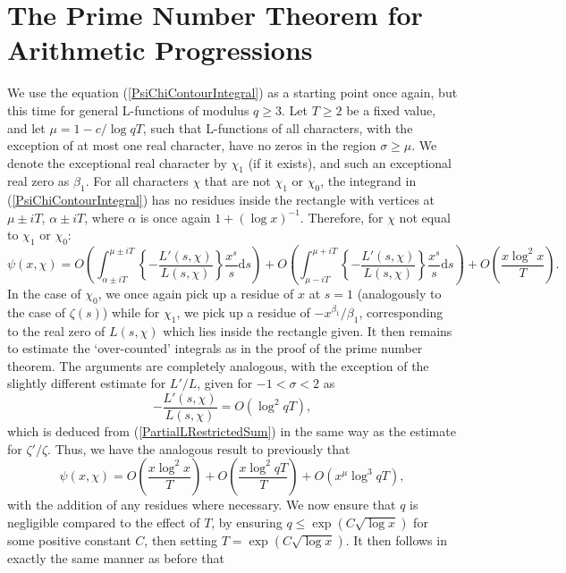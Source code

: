 \section{The Prime Number Theorem for Arithmetic Progressions}
We use the equation (\ref{PsiChiContourIntegral}) as a starting point once again, but this time for general L-functions of modulus $q \geq 3$. Let $T \geq 2$ be a fixed value, and let $\mu = 1 - c/\log q T$, such that L-functions of all characters, with the exception of at most one real character, have no zeros in the region $\sigma \geq \mu$. We denote the exceptional real character by $\chi_1$ (if it exists), and such an exceptional real zero as $\beta_1$. For all characters $\chi$ that are not $\chi_1$ or $\chi_0$, the integrand in (\ref{PsiChiContourIntegral}) has no residues inside the rectangle with vertices at $\mu \pm iT$, $\alpha \pm iT$, where $\alpha$ is once again $1 + (\log x)^{-1}$. Therefore, for $\chi$ not equal to $\chi_1$ or $\chi_0$:
\begin{equation}
    \psi(x, \chi) = O\left(\int_{\alpha \pm iT}^{\mu \pm iT} \left\{-\frac{L'(s, \chi)}{L(s, \chi)} \right\}\frac{x^{s}}{s} \mathrm{d} s \right) + O\left(\int_{\mu - iT}^{\mu + iT} \left\{-\frac{L'(s, \chi)}{L(s, \chi)} \right\}\frac{x^{s}}{s} \mathrm{d} s \right) + O\left(\frac{x \log^{2}x}{T} \right). \nonumber
\end{equation}
In the case of $\chi_0$, we once again pick up a residue of $x$ at $s = 1$ (analogously to the case of $\zeta(s)$) while for $\chi_1$, we pick up a residue of $-x^{\beta_1}/\beta_1$, corresponding to the real zero of $L(s, \chi)$ which lies inside the rectangle given. It then remains to estimate the `over-counted' integrals as in the proof of the prime number theorem. The arguments are completely analogous, with the exception of the slightly different estimate for $L'/L$, given for $-1 < \sigma < 2$ as 
\begin{equation}
    -\frac{L'(s, \chi)}{L(s, \chi)} = O(\log^{2} q T), \nonumber
\end{equation}
which is deduced from (\ref{PartialLRestrictedSum}) in the same way as the estimate for $\zeta'/\zeta$. Thus, we have the analogous result to previously that
\begin{equation}
    \psi(x, \chi) = O(\frac{x \log^{2} x}{T}) + O(\frac{x \log^{2}qT}{T}) + O(x^{\mu} \log^{3} qT), \nonumber
\end{equation}
with the addition of any residues where necessary. We now ensure that $q$ is negligible compared to the effect of $T$, by ensuring $q \leq \exp(C\sqrt{\log x})$ for some positive constant $C$, then setting $T = \exp(C\sqrt{\log x})$. It then follows in exactly the same manner as before that
